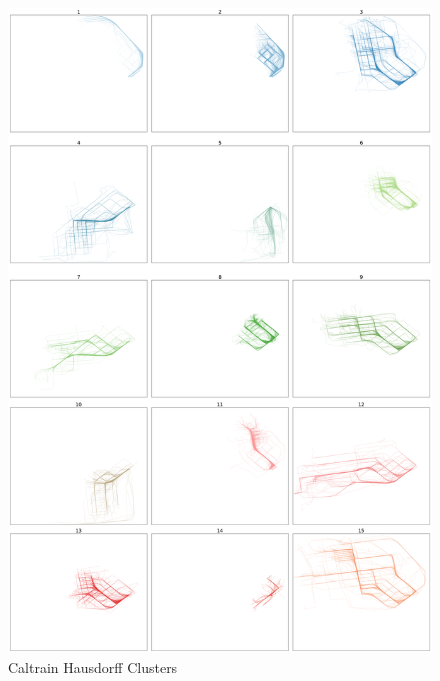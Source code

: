 \documentclass[a4paper, 12pt]{article}
\begin{document}
\begin{figure}[htbp!]
    \centering
    \includegraphics[width=1\textwidth]{Caltrain Hausdorff.png}
    \caption{Caltrain Hausdorff Clusters}
    \label{fig38}
\end{figure}
\end{document}
